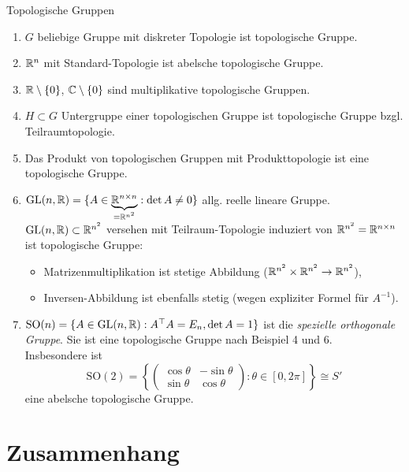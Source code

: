 \begin{example}{Topologische Gruppen}
  \begin{enumerate}
    \item $ G $ beliebige Gruppe mit diskreter Topologie ist topologische Gruppe.
    \item $ \mathbb{R}^n $ mit Standard-Topologie ist abelsche topologische Gruppe.
    \item $ \mathbb{R} \setminus \{ 0 \} $, $ \mathbb{C} \setminus \{ 0 \} $ sind multiplikative topologische Gruppen.
    \item $ H \subset G $ Untergruppe einer topologischen Gruppe ist topologische Gruppe bzgl. Teilraumtopologie.
    \item Das Produkt von topologischen Gruppen mit Produkttopologie ist eine topologische Gruppe.
    \item $ \text{GL}(n,\mathbb{R}) = \{ A \in \underbrace{\mathbb{R}^{n \times n}}_{= \mathbb{R}^{n^2}} : \det A \neq 0 \} $ allg. reelle lineare Gruppe. \\
      $ \text{GL}(n,\mathbb{R}) \subset \mathbb{R}^{n^2} $ versehen mit Teilraum-Topologie induziert von $ \mathbb{R}^{n^2} = \mathbb{R}^{n \times n} $ ist topologische Gruppe:
      \begin{itemize}
        \item Matrizenmultiplikation ist stetige Abbildung ($ \mathbb{R}^{n^2} \times \mathbb{R}^{n^2} \to \mathbb{R}^{n^2} $),
        \item Inversen-Abbildung ist ebenfalls stetig (wegen expliziter Formel für $ A^{-1} $).
      \end{itemize}
    \item $ \text{SO}(n) = \{ A \in \text{GL}(n,\mathbb{R}) : A^\top A = E_n, \det A = 1 \} $ ist die \emph{spezielle orthogonale Gruppe}. Sie ist eine topologische Gruppe nach Beispiel 4 und 6. \\
      Insbesondere ist
      \begin{equation*}
        \text{SO}(2) = \left\{ \begin{pmatrix}
          \cos \theta & -\sin \theta \\
          \sin \theta & \cos \theta
        \end{pmatrix} : \theta \in [0, 2\pi] \right\} \cong S'
      \end{equation*}
      eine abelsche topologische Gruppe.
  \end{enumerate}
\end{example}

\section{Zusammenhang}


